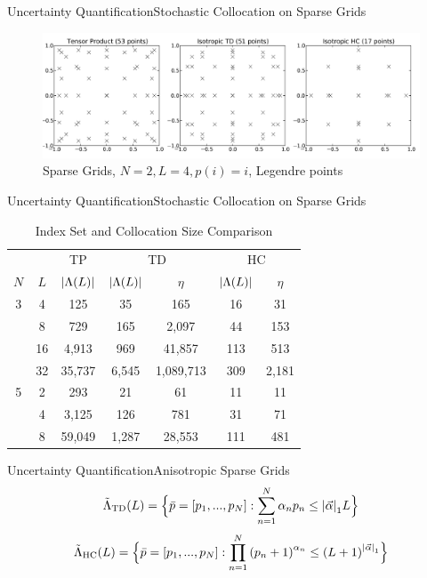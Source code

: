 \documentclass{beamer}
\begin{document}
\begin{frame}{Uncertainty Quantification}{Stochastic Collocation on Sparse Grids}\normalsize\vspace{-20pt}
\begin{figure}[H]
\centering
  \includegraphics[width=\linewidth]{../graphics/jpgsparse}
  \caption{Sparse Grids, $N=2,L=4,p(i)=i$, Legendre points}
  \label{collsets}
\end{figure}
\end{frame}

\begin{frame}{Uncertainty Quantification}{Stochastic Collocation on Sparse Grids}\normalsize\vspace{-20pt}
\begin{table}
\centering
\begin{tabular}{c|c|c|c c|c c}
 &  & TP & \multicolumn{2}{|c|}{TD} & \multicolumn{2}{|c}{HC} \\ 
$N$ & $L$ & $\qty|\Lambda(L)|$ & $\qty|\Lambda(L)|$ & $\eta$ & $\qty|\Lambda(L)|$ & $\eta$\\ \hline
3 & 4 & 125    & 35    & 165   & 16 & 31\\
 & 8   & 729    & 165  & 2,097  & 44 & 153\\
 & 16 & 4,913  & 969   & 41,857 & 113 & 513\\
 & 32 & 35,737 & 6,545 & 1,089,713 & 309 & 2,181\\ \hline
5 & 2 & 293 & 21 & 61 & 11 & 11\\
 & 4 & 3,125 & 126 & 781 & 31 & 71\\
 & 8 & 59,049 & 1,287 & 28,553 & 111 & 481 
\end{tabular}
\caption{Index Set and Collocation Size Comparison}
\label{compIS}
\end{table}
\end{frame}

\begin{frame}{Uncertainty Quantification}{Anisotropic Sparse Grids}\normalsize\vspace{-20pt}
\begin{equation*}
\tilde\Lambda_\text{TD}(L)=\Big\{\bar p=[p_1,...,p_N]:\sum_{n=1}^N \alpha_n p_n \leq \qty|\vec\alpha|_1 L \Big\}
\end{equation*}
\begin{equation*}
\tilde\Lambda_\text{HC}(L)=\Big\{\bar p=[p_1,...,p_N]:\prod_{n=1}^N \qty(p_n+1)^{\alpha_n} \leq \qty(L+1)^{\qty|\vec\alpha|_1} \Big\}
\end{equation*}
\end{frame}
\end{document}
